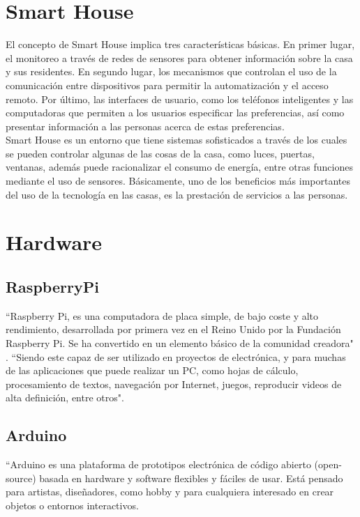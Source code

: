 \section{Smart House}

El concepto de Smart House implica tres características básicas. En primer lugar, el monitoreo a través de redes de sensores para obtener información sobre la casa y sus residentes. En segundo lugar, los mecanismos que controlan el uso de la comunicación entre dispositivos para permitir la automatización y el acceso remoto. Por último, las interfaces de usuario, como los teléfonos inteligentes y las computadoras que permiten a los usuarios especificar las preferencias, así como presentar información a las personas acerca de estas preferencias. \\

Smart House es un entorno que tiene sistemas sofisticados a través de los cuales se pueden controlar algunas de las cosas de la casa, como luces, puertas, ventanas, además  puede racionalizar el consumo de energía, entre otras funciones mediante el uso de sensores. Básicamente, uno de los beneficios más importantes del uso de la tecnología en las casas, es la prestación de servicios a las personas.\cite{Howedi2016} \\

\section{Hardware}

\subsection{RaspberryPi}

``Raspberry Pi, es una computadora de placa simple, de bajo coste y alto rendimiento, desarrollada por primera vez en el Reino Unido por la Fundación Raspberry Pi. Se ha convertido en un elemento básico de la comunidad creadora" \cite{Adaf}. ``Siendo este capaz de ser utilizado en proyectos de electrónica, y para muchas de las aplicaciones que puede realizar un PC, como hojas de cálculo, procesamiento de textos, navegación por Internet, juegos, reproducir videos de alta definición, entre otros". \cite{Rasp}

\subsection{Arduino}

``Arduino es una plataforma de prototipos electrónica de código abierto (open-source) basada en hardware y software flexibles y fáciles de usar. Está pensado para artistas, diseñadores, como hobby y para cualquiera interesado en crear objetos o entornos interactivos.\\


